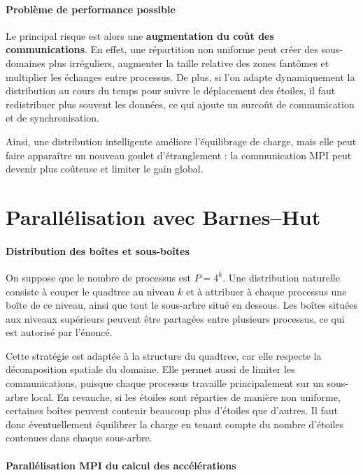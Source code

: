 \documentclass[11pt,a4paper]{article}
\begin{document}
\paragraph{Problème de performance possible}

Le principal risque est alors une \textbf{augmentation du coût des communications}. En effet, une répartition non uniforme peut créer des sous-domaines plus irréguliers, augmenter la taille relative des zones fantômes et multiplier les échanges entre processus. De plus, si l'on adapte dynamiquement la distribution au cours du temps pour suivre le déplacement des étoiles, il faut redistribuer plus souvent les données, ce qui ajoute un surcoût de communication et de synchronisation.

Ainsi, une distribution intelligente améliore l'équilibrage de charge, mais elle peut faire apparaître un nouveau goulet d'étranglement : la communication MPI peut devenir plus coûteuse et limiter le gain global.

\section{Parallélisation avec Barnes--Hut}

\paragraph{Distribution des boîtes et sous-boîtes}

On suppose que le nombre de processus est $P=4^k$. Une distribution naturelle consiste à couper le quadtree au niveau $k$ et à attribuer à chaque processus une boîte de ce niveau, ainsi que tout le sous-arbre situé en dessous. Les boîtes situées aux niveaux supérieurs peuvent être partagées entre plusieurs processus, ce qui est autorisé par l'énoncé.

Cette stratégie est adaptée à la structure du quadtree, car elle respecte la décomposition spatiale du domaine. Elle permet aussi de limiter les communications, puisque chaque processus travaille principalement sur un sous-arbre local. En revanche, si les étoiles sont réparties de manière non uniforme, certaines boîtes peuvent contenir beaucoup plus d'étoiles que d'autres. Il faut donc éventuellement équilibrer la charge en tenant compte du nombre d'étoiles contenues dans chaque sous-arbre.

\paragraph{Parallélisation MPI du calcul des accélérations}
\end{document}
